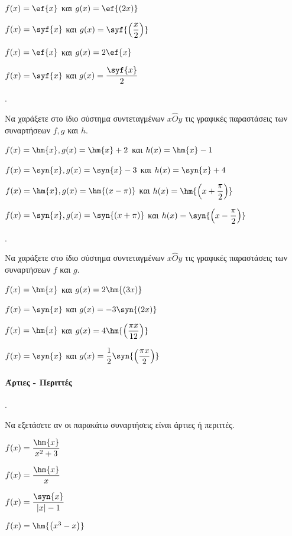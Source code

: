 \documentclass[11pt,a4paper,twocolumn]{article}
\newcounter{askhsh}
\newcommand{\askhsh}{{\large\theaskhsh.}\ \addtocounter{askhsh}{1}}
\begin{document}
\begin{alist}
\item $f(x)=\ef{x}$ και $g(x)=\ef{(2x)}$
\item $f(x)=\syf{x}$ και $g(x)=\syf{\left(\dfrac{x}{2}\right)}$
\item $f(x)=\ef{x}$ και $g(x)=2\ef{x}$
\item $f(x)=\syf{x}$ και $g(x)=\dfrac{\syf{x}}{2}$
\end{alist}
\askhsh Να χαράξετε στο ίδιο σύστημα συντεταγμένων $x\hat{O}y$ τις γραφικές παραστάσεις των συναρτήσεων $f,g$ και $h$.
\begin{alist}
\item $f(x)=\hm{x},g(x)=\hm{x}+2$ και $h(x)=\hm{x}-1$
\item $f(x)=\syn{x},g(x)=\syn{x}-3$ και $h(x)=\syn{x}+4$
\item $f(x)=\hm{x},g(x)=\hm{(x-\pi)}$ και $h(x)=\hm{\left(x+\dfrac{\pi}{2}\right)}$
\item $f(x)=\syn{x},g(x)=\syn{(x+\pi)}$ και $h(x)=\syn{\left(x-\dfrac{\pi}{2}\right)}$
\end{alist}
\askhsh Να χαράξετε στο ίδιο σύστημα συντεταγμένων $x\hat{O}y$ τις γραφικές παραστάσεις των συναρτήσεων $f$ και $g$.
\begin{alist}
\item $f(x)=\hm{x}$ και $g(x)=2\hm{(3x)}$
\item $f(x)=\syn{x}$ και $g(x)=-3\syn{(2x)}$
\item $f(x)=\hm{x}$ και $g(x)=4\hm{\left(\dfrac{\pi x}{12}\right)}$
\item $f(x)=\syn{x}$ και $g(x)=\dfrac{1}{2}\syn{\left(\dfrac{\pi x}{2}\right)}$
\end{alist}
\paragraph{Άρτιες - Περιττές}
\askhsh Να εξετάσετε αν οι παρακάτω συναρτήσεις είναι άρτιες ή περιττές.
\begin{multicols}{2}
\begin{alist}
\item $f(x)=\dfrac{\hm{x}}{x^2+3}$
\item $f(x)=\dfrac{\hm{x}}{x}$
\item $f(x)=\dfrac{\syn{x}}{|x|-1}$
\item $f(x)=\hm{\left(x^3-x\right)}$
\end{alist}
\end{multicols}
\end{document}
